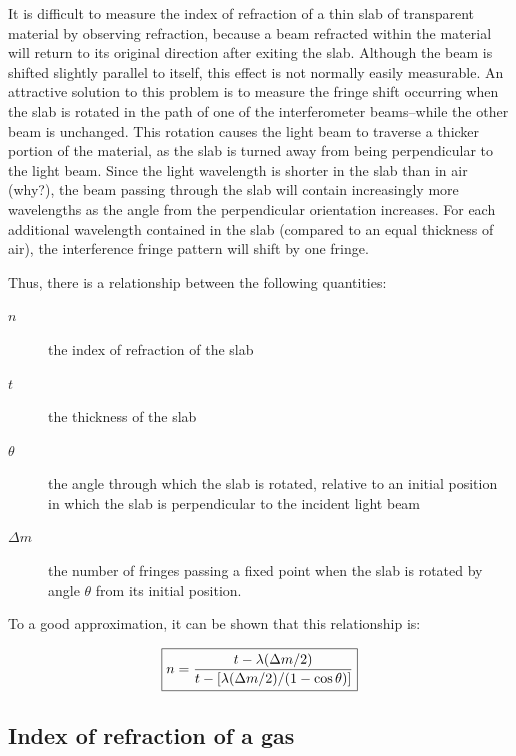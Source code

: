 It is difficult to measure the index of refraction of a thin 
slab of transparent material by observing refraction, because 
a beam refracted within the material will return to its original 
direction after exiting the slab. Although the beam is shifted 
slightly parallel to itself, this effect is not normally easily 
measurable. An attractive solution to this problem is to measure 
the fringe shift occurring when the slab is rotated in the path 
of one of the interferometer beams--while the other beam is unchanged. 
This rotation causes the light beam to traverse a thicker portion 
of the material, as the slab is turned away from being perpendicular 
to the light beam. Since the light wavelength is shorter in the 
slab than in air (why?), the beam passing through the slab will 
contain increasingly more wavelengths as the angle from the perpendicular 
orientation increases. For each additional wavelength contained 
in the slab (compared to an equal thickness of air), the interference 
fringe pattern will shift by one fringe.

Thus, there is a relationship between the following quantities:

\begin{description}

\item[$n$]  the index of refraction of the slab
\item[$t$]  the thickness of the slab
\item[$\theta$]  the angle through which the slab is rotated, relative to an  initial position in which the slab is perpendicular to the  incident light beam
\item[$\Delta m$]  the number of fringes passing a fixed point when the slab 
is  rotated by angle \ensuremath{\theta} from its initial position.

\end{description}


To a good approximation, it can be shown that this relationship 
is:

\begin{equation}
\boxed{ n = { t - \lambda ( \Delta m/2) \over t - \left[ \lambda ( \Delta m/2)/(1-\cos\theta) \right] }
\label{eq:glassslide}}
\end{equation}


\subsection{Index of refraction of a gas}

